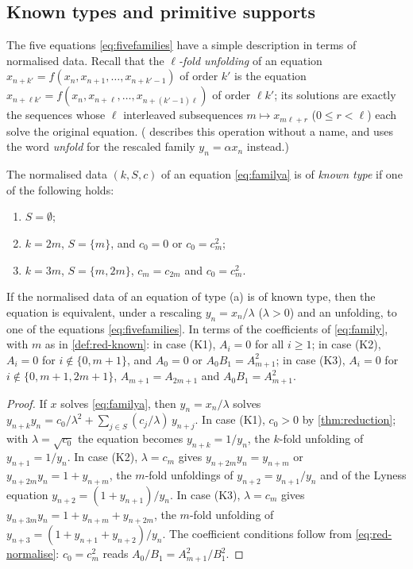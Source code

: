 \subsection{Known types and primitive supports}

The five equations \eqref{eq:fivefamilies} have a simple description in terms
of normalised data. Recall that the \textit{$\ell$-fold unfolding} of an equation
$x_{n+k'}=f(x_n,x_{n+1},\dots,x_{n+k'-1})$ of order $k'$ is the equation
$x_{n+\ell k'}=f(x_n,x_{n+\ell},\dots,x_{n+(k'-1)\ell})$ of order $\ell k'$; its solutions
are exactly the sequences whose $\ell$ interleaved subsequences
$m\mapsto x_{m\ell+r}$ ($0\le r<\ell$) each solve the original equation.
(\citet{Gasull2021} describes this operation without a name, and uses the
word \emph{unfold} for the rescaled family $y_n=\alpha x_n$ instead.)

\begin{definition}
\label{def:red-known}
The normalised data $(k,S,c)$ of an equation \eqref{eq:familya} is of
\textit{known type} if one of the following holds:
\begin{enumerate}
\item[(K1)] $S=\emptyset$;
\item[(K2)] $k=2m$, $S=\{m\}$, and $c_0=0$ or $c_0=c_m^2$;
\item[(K3)] $k=3m$, $S=\{m,2m\}$, $c_m=c_{2m}$ and $c_0=c_m^2$.
\end{enumerate}
\end{definition}

\begin{lemma}
\label{lem:red-members}
If the normalised data of an equation of type (a) is of known type, then the
equation is equivalent, under a rescaling $y_n=x_n/\lambda$ ($\lambda>0$) and
an unfolding, to one of the equations \eqref{eq:fivefamilies}. In terms of the
coefficients of \eqref{eq:family}, with $m$ as in \autoref{def:red-known}:
in case (K1), $A_i=0$ for all $i\ge1$; in case (K2), $A_i=0$ for
$i\notin\{0,m+1\}$, and $A_0=0$ or $A_0B_1=A_{m+1}^2$; in case (K3), $A_i=0$
for $i\notin\{0,m+1,2m+1\}$, $A_{m+1}=A_{2m+1}$ and $A_0B_1=A_{m+1}^2$.
\end{lemma}

\begin{proof}
If $x$ solves \eqref{eq:familya}, then $y_n=x_n/\lambda$ solves
$y_{n+k}y_n=c_0/\lambda^2+\sum_{j\in S}(c_j/\lambda)\,y_{n+j}$. In case (K1),
$c_0>0$ by \autoref{thm:reduction}; with $\lambda=\sqrt{c_0}$ the equation
becomes $y_{n+k}=1/y_n$, the $k$-fold unfolding of $y_{n+1}=1/y_n$. In case
(K2), $\lambda=c_m$ gives $y_{n+2m}y_n=y_{n+m}$ or $y_{n+2m}y_n=1+y_{n+m}$,
the $m$-fold unfoldings of $y_{n+2}=y_{n+1}/y_n$ and of the Lyness equation
$y_{n+2}=(1+y_{n+1})/y_n$. In case (K3), $\lambda=c_m$ gives
$y_{n+3m}y_n=1+y_{n+m}+y_{n+2m}$, the $m$-fold unfolding of
$y_{n+3}=(1+y_{n+1}+y_{n+2})/y_n$. The coefficient conditions follow from
\eqref{eq:red-normalise}: $c_0=c_m^2$ reads $A_0/B_1=A_{m+1}^2/B_1^2$.
\end{proof}

